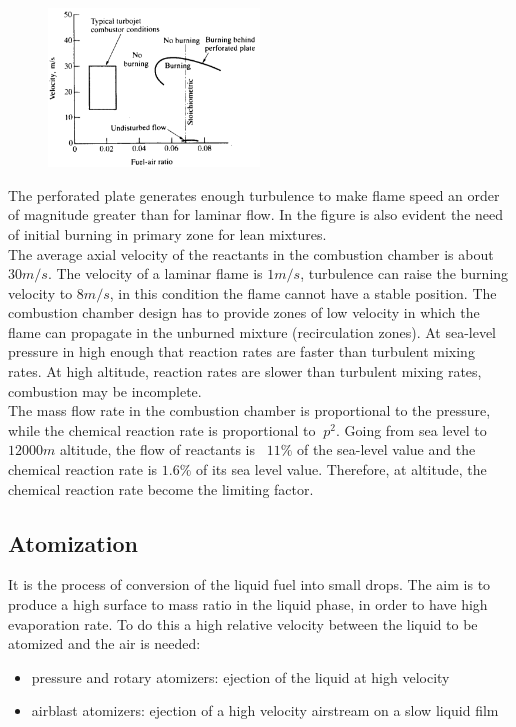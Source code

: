 \documentclass[12pt]{article}
\begin{document}
\begin{figure}[!ht]
\centering
\includegraphics[width=0.5\textwidth]{figures/flame1.png}
\end{figure}

The perforated plate generates enough turbulence to make flame speed an order of magnitude greater than for laminar flow. In the figure is also evident the need of initial burning in primary zone for lean mixtures.\\
The average axial velocity of the reactants in the combustion chamber is about $30 m/s$. The velocity of a laminar flame is $1 m/s$, turbulence can raise the burning velocity to $8 m/s$, in this condition the flame cannot have a stable position. The combustion chamber design has to provide zones of low velocity in which the flame can propagate in the unburned mixture (recirculation zones). At sea-level pressure in high enough that reaction rates are faster than turbulent mixing rates. At high altitude, reaction rates are slower than turbulent mixing rates, combustion may be incomplete.\\
The mass flow rate in the combustion chamber is proportional to the pressure, while the chemical reaction rate is proportional to $~p^{2}$. Going from sea level to $12000 m$ altitude, the flow of reactants is ~$11\%$ of the sea-level value and the chemical reaction rate is $1.6\%$ of its sea level value. Therefore, at altitude, the chemical reaction rate become the limiting factor.

\subsection{Atomization}

It is the process of conversion of the liquid fuel into small drops. The aim is to produce a high surface to mass ratio in the liquid phase, in order to have high evaporation rate. To do this a high relative velocity between the liquid to be atomized and the air is needed:
\begin{itemize}
    \item pressure and rotary atomizers: ejection of the liquid at high velocity
    \item airblast atomizers: ejection of a high velocity airstream on a slow liquid film
\end{itemize}
\end{document}
